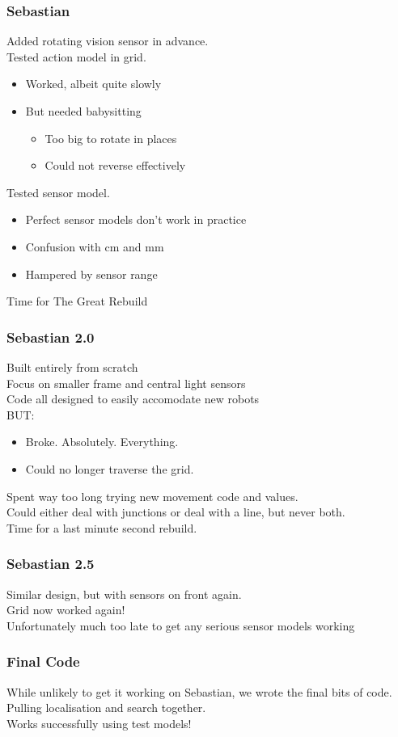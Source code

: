 \documentclass{beamer}
\begin{document}
\begin{frame}
    \frametitle{Sebastian}
    Added rotating vision sensor in advance. \\ \pause
    Tested action model in grid. \pause
    \begin{itemize}
        \item Worked, albeit quite slowly \pause
        \item But needed babysitting \pause
            \begin{itemize}
                \item Too big to rotate in places \pause
                \item Could not reverse effectively \pause
            \end{itemize}
    \end{itemize}
    Tested sensor model. \pause
    \begin{itemize}
        \item Perfect sensor models don't work in practice \pause
        \item Confusion with cm and mm \pause
        \item Hampered by sensor range \pause
    \end{itemize}
    Time for The Great Rebuild\texttrademark
\end{frame}

\begin{frame}
    \frametitle{Sebastian 2.0}
    Built entirely from scratch \\ \pause
    Focus on smaller frame and central light sensors \\ \pause
    Code all designed to easily accomodate new robots \\ \pause
    BUT: \pause
    \begin{itemize}
        \item Broke. Absolutely. Everything. \pause
        \item Could no longer traverse the grid. \pause
    \end{itemize}
    Spent way too long trying new movement code and values. \\ \pause
    Could either deal with junctions or deal with a line, but never both. \\ \pause
    Time for a last minute second rebuild. \\
\end{frame}

\begin{frame}
    \frametitle{Sebastian 2.5}
    Similar design, but with sensors on front again. \\ \pause
    Grid now worked again! \\ \pause
    Unfortunately much too late to get any serious sensor models working
\end{frame}

\begin{frame}
    \frametitle{Final Code}
    While unlikely to get it working on Sebastian, we wrote the final bits of code. \\ \pause
    Pulling localisation and search together. \\ \pause
    Works successfully using test models! \\ \pause
\end{frame}
\end{document}
